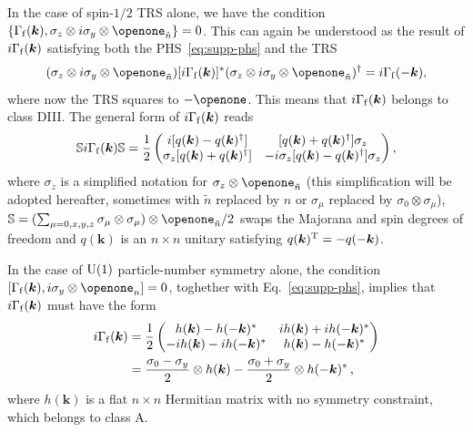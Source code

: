 \documentclass[prl,twocolumn,preprintnumbers,superscriptaddress,amsmath,amssymb]{revtex4-1}
\begin{document}
In the case of spin-$1/2$ TRS alone, we have the condition $\{\Gamma_{\rm f}(\boldsymbol{k}),\sigma_z\otimes i\sigma_y\otimes\openone_{\tilde n}\}=0$. This can again be understood as 
the result of $i\Gamma_{\rm f}(\boldsymbol{k})$ satisfying both the PHS~\eqref{eq:supp-phs} and the TRS
\begin{equation}
    (\sigma_z\otimes i\sigma_y\otimes\openone_{\tilde n}) [i\Gamma_{\rm f}(\boldsymbol{k})]^* (\sigma_z\otimes i\sigma_y\otimes\openone_{\tilde n})^\dag=i\Gamma_{\rm f}(-\boldsymbol{k}),
    \label{eq:supp-spin-trs}
\end{equation}
where now the TRS squares to $-\openone$. This means that $i\Gamma_{\rm f}(\boldsymbol{k})$ belongs to class DIII. The general form of $i\Gamma_{\rm f}(\boldsymbol{k})$ reads
\begin{equation}
\mathbb{S}i\Gamma_{\rm f}(\boldsymbol{k})\mathbb{S}=\frac{1}{2}\begin{pmatrix} i[q(\boldsymbol{k})-q(\boldsymbol{k})^\dag] & [q(\boldsymbol{k})+q(\boldsymbol{k})^\dag]\sigma_z  \\ \sigma_z[q(\boldsymbol{k})+q(\boldsymbol{k})^\dag] & -i\sigma_z[q(\boldsymbol{k})-q(\boldsymbol{k})^\dag]\sigma_z \end{pmatrix},
\label{DIIIH}
\end{equation}
where $\sigma_z$ is a simplified notation for $\sigma_z\otimes\openone_{\tilde n}$ (this simplification will be adopted hereafter, sometimes with $\tilde n$ replaced by $n$ or $\sigma_\mu$ replaced by $\sigma_0\otimes\sigma_\mu$), $\mathbb{S}=(\sum_{\mu=0,x,y,z}\sigma_\mu\otimes\sigma_\mu)\otimes\openone_{\tilde n}/2$ swaps the Majorana and spin degrees of freedom and $q(\boldsymbol{k})$ is an $n\times n$ unitary satisfying $q(\boldsymbol{k})^{\rm T}=-q(-\boldsymbol{k})$.

In the case of ${\rm U}(1)$ particle-number symmetry alone, the condition $[\Gamma_{\rm f}(\boldsymbol{k}),i\sigma_y\otimes\openone_n]=0$, toghether with Eq.~\eqref{eq:supp-phs}, implies that $i\Gamma_{\rm f}(\boldsymbol{k})$ must have the form
\begin{align}
i\Gamma_{\rm f}(\boldsymbol{k})&=\frac{1}{2}\begin{pmatrix} h(\boldsymbol{k}) - h(-\boldsymbol{k})^* & ih(\boldsymbol{k}) + ih(-\boldsymbol{k})^* \\ - ih(\boldsymbol{k}) - ih(-\boldsymbol{k})^* & h(\boldsymbol{k}) - h(-\boldsymbol{k})^* \end{pmatrix} \nonumber\\
&= \frac{\sigma_0-\sigma_y}{2}\otimes h(\boldsymbol{k}) - \frac{\sigma_0+\sigma_y}{2}\otimes h(-\boldsymbol{k})^*\,,
\label{eq:supp-iGammma-as-function-of-H}
\end{align}
where $h(\boldsymbol{k})$ is a flat $n\times n$ Hermitian matrix with no symmetry constraint, which belongs to class A.
\end{document}
